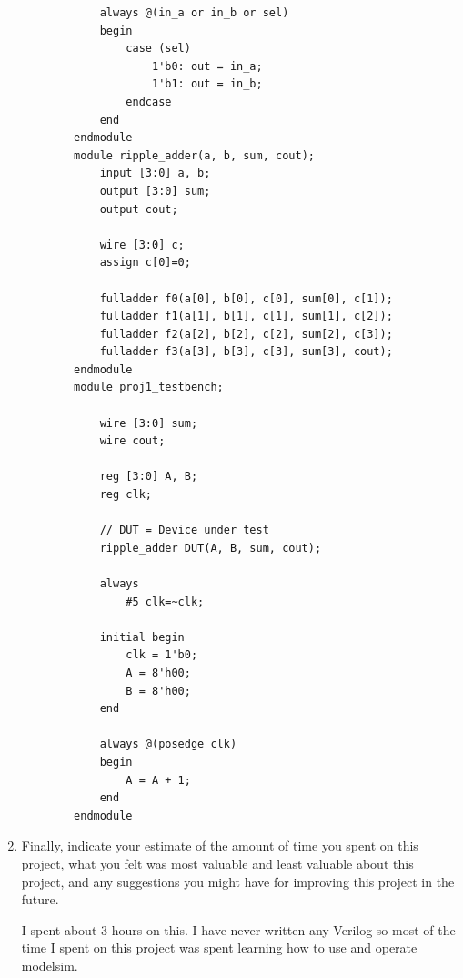 \documentclass[12pt]{article}
\begin{document}
\begin{enumerate}
{\begin{verbatim}
            always @(in_a or in_b or sel)
            begin
                case (sel)
                    1'b0: out = in_a;
                    1'b1: out = in_b;
                endcase
            end
        endmodule
        module ripple_adder(a, b, sum, cout);
            input [3:0] a, b;
            output [3:0] sum;
            output cout;

            wire [3:0] c;
            assign c[0]=0;

            fulladder f0(a[0], b[0], c[0], sum[0], c[1]);
            fulladder f1(a[1], b[1], c[1], sum[1], c[2]);
            fulladder f2(a[2], b[2], c[2], sum[2], c[3]);
            fulladder f3(a[3], b[3], c[3], sum[3], cout);
        endmodule
        module proj1_testbench;

            wire [3:0] sum;
            wire cout;

            reg [3:0] A, B;
            reg clk;

            // DUT = Device under test
            ripple_adder DUT(A, B, sum, cout);

            always
                #5 clk=~clk;

            initial begin
                clk = 1'b0;
                A = 8'h00;
                B = 8'h00;
            end

            always @(posedge clk)
            begin
                A = A + 1;
            end
        endmodule
    \end{verbatim}
    }

    \item
    Finally, indicate your estimate of the amount of time you spent on this project, what you  felt  was  most  valuable  and  least  valuable  about  this  project,  and  any suggestions you might have for improving this project in the future.

    I spent about 3 hours on this. I have never written any Verilog so most of the time I spent on this project was spent learning how to use and operate modelsim.

\end{enumerate}
\end{document}
